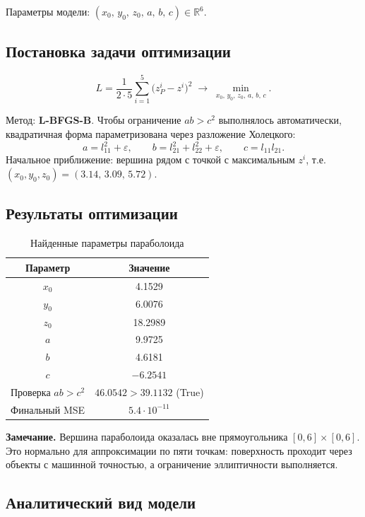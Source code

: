 \documentclass[12pt,a4paper]{article}
\begin{document}
Параметры модели: $(x_0,\, y_0,\, z_0,\, a,\, b,\, c) \in \mathbb{R}^6$.

\subsection{Постановка задачи оптимизации}

\begin{equation}
  L = \frac{1}{2 \cdot 5}\sum_{i=1}^{5}\bigl(z_P^i - z^i\bigr)^2
  \;\longrightarrow\; \min_{x_0,\, y_0,\, z_0,\, a,\, b,\, c}.
\end{equation}

Метод: \textbf{L-BFGS-B}. Чтобы ограничение $ab > c^2$ выполнялось автоматически,
квадратичная форма параметризована через разложение Холецкого:
\[
  a = l_{11}^2 + \varepsilon,\qquad
  b = l_{21}^2 + l_{22}^2 + \varepsilon,\qquad
  c = l_{11}l_{21}.
\]
Начальное приближение: вершина рядом с точкой с максимальным $z^i$,
т.е.\ $(x_0, y_0, z_0) = (3.14,\, 3.09,\, 5.72)$.

\subsection{Результаты оптимизации}

\begin{table}[H]
\centering
\caption{Найденные параметры параболоида}
\begin{tabular}{cc}
\toprule
Параметр & Значение \\
\midrule
$x_0$ & 4.1529 \\
$y_0$ & 6.0076 \\
$z_0$ & 18.2989 \\
$a$   & 9.9725 \\
$b$   & 4.6181 \\
$c$   & $-6.2541$ \\
Проверка $ab > c^2$ & $46.0542 > 39.1132$ (True) \\
Финальный MSE & $5.4\cdot 10^{-11}$ \\
\bottomrule
\end{tabular}
\end{table}

\textbf{Замечание.} Вершина параболоида оказалась вне прямоугольника $[0,6]\times[0,6]$.
Это нормально для аппроксимации по пяти точкам: поверхность проходит через объекты
с машинной точностью, а ограничение эллиптичности выполняется.

\subsection{Аналитический вид модели}
\end{document}
